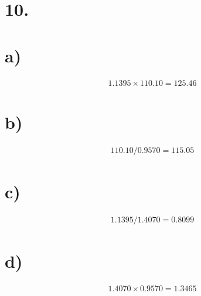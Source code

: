 \documentclass[paper=a4, fontsize=11pt]{scrartcl} %
\numberwithin{equation}{section} %
\numberwithin{figure}{section} %
\numberwithin{table}{section} %
\begin{document}
\section*{10.}


\section*{a)}

\begin{align*}
1.1395\times110.10 = 125.46
\end{align*}


\section*{b)}

\begin{align*}
110.10/0.9570 = 115.05
\end{align*}


\section*{c)}

\begin{align*}
1.1395/1.4070 = 0.8099
\end{align*}


\section*{d)}

\begin{align*}
1.4070\times0.9570 = 1.3465
\end{align*}
\end{document}
